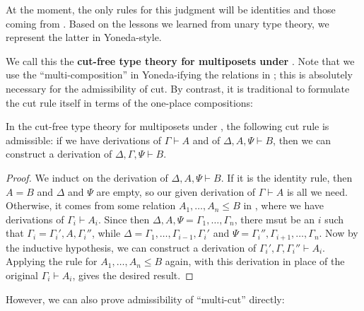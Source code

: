 \documentclass{book}
\let\types\vdash
\begin{document}
At the moment, the only rules for this judgment will be identities and those coming from \cG.
Based on the lessons we learned from unary type theory, we represent the latter in Yoneda-style.
We call this the \textbf{cut-free type theory for multiposets under \cG}.
Note that we use the ``multi-composition'' in Yoneda-ifying the relations in \cG; this is absolutely necessary for the admissibility of cut.
By contrast, it is traditional to formulate the cut rule itself in terms of the one-place compositions:

\begin{thm}\label{thm:multiposet-cutadm}
  In the cut-free type theory for multiposets under \cG, the following cut rule is admissible: if we have derivations of $\Gamma\types A$ and of $\Delta,A,\Psi\types B$, then we can construct a derivation of $\Delta,\Gamma,\Psi\types B$.
\end{thm}
\begin{proof}
  We induct on the derivation of $\Delta,A,\Psi\types B$.
  If it is the identity rule, then $A=B$ and $\Delta$ and $\Psi$ are empty, so our given derivation of $\Gamma\types A$ is all we need.
  Otherwise, it comes from some relation $A_1,\dots,A_n \le B$ in \cG, where we have derivations of $\Gamma_i \types A_i$.
  Since then $\Delta,A,\Psi = \Gamma_1,\dots,\Gamma_n$, there msut be an $i$ such that $\Gamma_i = \Gamma_i',A,\Gamma_i''$, while $\Delta = \Gamma_1,\dots,\Gamma_{i-1},\Gamma_i'$ and $\Psi = \Gamma_i'',\Gamma_{i+1},\dots,\Gamma_n$.
  Now by the inductive hypothesis, we can construct a derivation of $\Gamma_i',\Gamma,\Gamma_i''\types A_i$.
  Applying the rule for $A_1,\dots,A_n \le B$ again, with this derivation in place of the original $\Gamma_i \types A_i$, gives the desired result.
\end{proof}

However, we can also prove admissibility of ``multi-cut'' directly:
\end{document}
